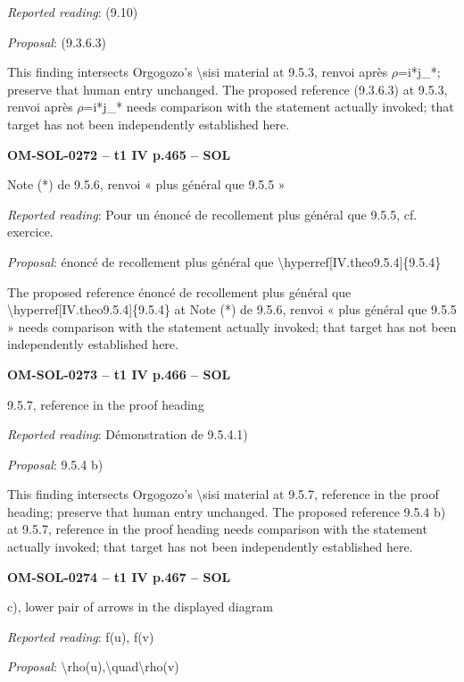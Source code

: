 \emph{Reported reading}: (9.10)\par
\emph{Proposal}: (9.3.6.3)\par
This finding intersects Orgogozo's \textbackslash{}sisi material at 9.5.3, renvoi après \ensuremath{\rho}=\allowbreak i*j\_*; preserve that human entry unchanged. The proposed reference (9.3.6.3) at 9.5.3, renvoi après \ensuremath{\rho}=\allowbreak i*j\_* needs comparison with the statement actually invoked; that target has not been independently established here.\par
\par\noindent\textbf{OM-SOL-0272 -- t1 IV p.465 -- SOL}\par
Note (*) de 9.5.6, renvoi « plus général que 9.5.5 »\par
\emph{Reported reading}: Pour un énoncé de recollement plus général que 9.5.5, cf. exercice.\par
\emph{Proposal}: énoncé de recollement plus général que \textbackslash{}hyperref[IV.theo9.5.4]\{9.5.4\}\par
The proposed reference énoncé de recollement plus général que \textbackslash{}hyperref[IV.theo9.5.4]\{9.5.4\} at Note (*) de 9.5.6, renvoi « plus général que 9.5.5 » needs comparison with the statement actually invoked; that target has not been independently established here.\par
\par\noindent\textbf{OM-SOL-0273 -- t1 IV p.466 -- SOL}\par
9.5.7, reference in the proof heading\par
\emph{Reported reading}: Démonstration de 9.5.4.1)\par
\emph{Proposal}: 9.5.4 b)\par
This finding intersects Orgogozo's \textbackslash{}sisi material at 9.5.7, reference in the proof heading; preserve that human entry unchanged. The proposed reference 9.5.4 b) at 9.5.7, reference in the proof heading needs comparison with the statement actually invoked; that target has not been independently established here.\par
\par\noindent\textbf{OM-SOL-0274 -- t1 IV p.467 -- SOL}\par
c), lower pair of arrows in the displayed diagram\par
\emph{Reported reading}: f(u), f(v)\par
\emph{Proposal}: \textbackslash{}rho(u),\textbackslash{}quad\textbackslash{}rho(v)\par
